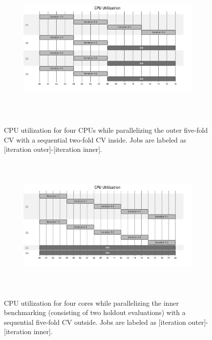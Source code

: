 \begin{figure}

{\centering 

\begin{figure}[H]

{\centering \includegraphics[width=5.5in,height=2.89in]{chapters/chapter10/advanced_technical_aspects_of_mlr3_files/figure-latex/mermaid-figure-1.png}

}

\end{figure}

}

\caption{\label{fig-parallel-outer}CPU utilization for four CPUs while
parallelizing the outer five-fold CV with a sequential two-fold CV
inside. Jobs are labeled as {[}iteration outer{]}-{[}iteration
inner{]}.}

\end{figure}

\begin{figure}

{\centering 

\begin{figure}[H]

{\centering \includegraphics[width=5.5in,height=2.72in]{chapters/chapter10/advanced_technical_aspects_of_mlr3_files/figure-latex/mermaid-figure-2.png}

}

\end{figure}

}

\caption{\label{fig-parallel-inner}CPU utilization for four cores while
parallelizing the inner benchmarking (consisting of two holdout
evaluations) with a sequential five-fold CV outside. Jobs are labeled as
{[}iteration outer{]}-{[}iteration inner{]}.}

\end{figure}

